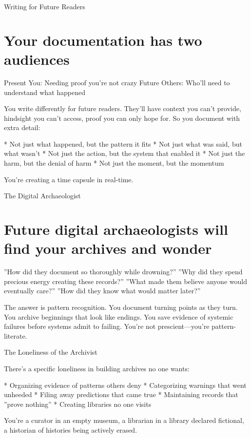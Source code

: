 \documentclass[12pt,oneside]{book}
\begin{document}
Writing for Future Readers

\section{Your documentation has two audiences}

Present You: Needing proof you're not crazy Future Others: Who'll need to understand what happened

You write differently for future readers. They'll have context you can't provide, hindsight you can't access, proof you can only hope for. So you document with extra detail:

                    * Not just what happened, but the pattern it fits
                    * Not just what was said, but what wasn't
                    * Not just the action, but the system that enabled it
                    * Not just the harm, but the denial of harm
                    * Not just the moment, but the momentum

You're creating a time capsule in real-time.

The Digital Archaeologist

\section{Future digital archaeologists will find your archives and wonder}

''How did they document so thoroughly while drowning?'' ''Why did they spend precious energy creating these records?'' ''What made them believe anyone would eventually care?'' ''How did they know what would matter later?''

The answer is pattern recognition. You document turning points as they turn. You archive beginnings that look like endings. You save evidence of systemic failures before systems admit to failing. You're not prescient---you're pattern-literate.

The Loneliness of the Archivist

There's a specific loneliness in building archives no one wants:

                    * Organizing evidence of patterns others deny
                    * Categorizing warnings that went unheeded
                    * Filing away predictions that came true
                    * Maintaining records that ''prove nothing''
                    * Creating libraries no one visits

You're a curator in an empty museum, a librarian in a library declared fictional, a historian of histories being actively erased.
\end{document}
